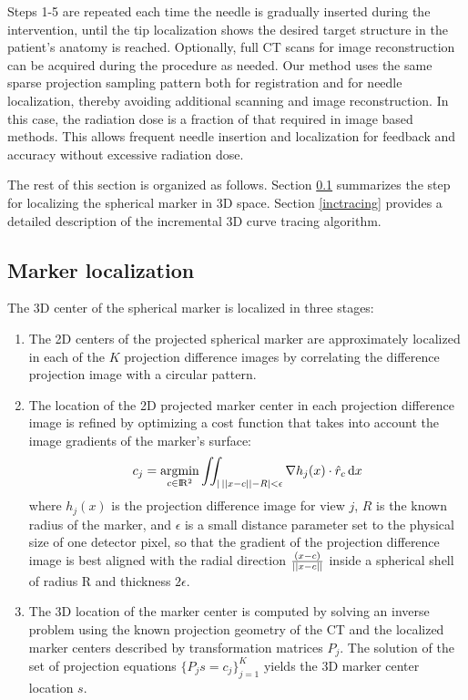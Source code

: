 Steps 1-5 are repeated each time the needle is gradually inserted during the intervention, until the tip localization shows the desired target structure in the patient's anatomy is reached. Optionally, full CT scans for image reconstruction can be acquired during the procedure as needed. Our method uses the same sparse projection sampling pattern both for registration and for needle localization, thereby avoiding additional scanning and image reconstruction. In this case, the radiation dose is a fraction of that required in image based methods. This allows frequent needle insertion and localization for feedback and accuracy without excessive radiation dose.

The rest of this section is organized as follows.
Section \ref{markerloc} summarizes the step for localizing the spherical marker in 3D space.
Section \ref{inctracing} provides a detailed description of the incremental 3D curve tracing algorithm.

\subsection{Marker localization} \label{markerloc}
The 3D center of the spherical marker is localized in three stages:
\begin{enumerate}
    \item 
    {
    The 2D centers of the projected spherical marker are approximately localized in each of the $K$ projection difference images by correlating the difference projection image with a circular pattern. 
    }
    \item 
    {
    The location of the 2D projected marker center in each projection difference image is refined by optimizing a cost function that  takes into account the image gradients of the marker's surface:
    \begin{equation}
        c_j = \operatorname*{argmin}_{c \in \rm I\!R^2}{
        \iint_{\lvert \, \lvert\lvert x-c \rvert\rvert - R \rvert < \epsilon}
        {\nabla h_j(x) \cdot \hat{r}_c} \, \mathrm{d}x}
    \end{equation}
    where $h_j(x)$ is the projection difference image for view $j$, $R$ is the known radius of the marker, and $\epsilon$ is a small distance parameter set to the physical size of one detector pixel, so that the gradient of the projection difference image is best aligned with the radial direction $\frac{(x-c)}{ \\\lvert\lvert x-c \rvert\rvert}$ inside a spherical shell of radius R and thickness $2\epsilon$.
    }
    \item
    {
    The 3D location of the marker center is computed by solving an inverse problem using the known projection geometry of the CT and the localized marker centers described by transformation matrices $P_j$. The solution of the set of projection equations $\{P_j s = c_j\}_{j=1}^K$  yields the 3D marker center location $s$.
    }
\end{enumerate}



